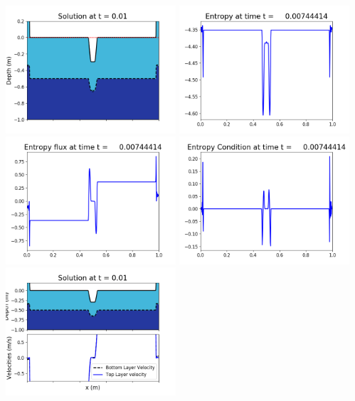 \documentclass[11pt]{article}
\begin{document}
\includegraphics[width=0.475\textwidth]{frame0018fig1006.png}
\vskip 10pt 
\includegraphics[width=0.475\textwidth]{frame0018fig1007.png}
\includegraphics[width=0.475\textwidth]{frame0018fig1008.png}
\vskip 10pt 
\includegraphics[width=0.475\textwidth]{frame0018fig1009.png}
\vskip 10pt 
\includegraphics[width=0.475\textwidth]{frame0019fig1001.png}
\end{document}
